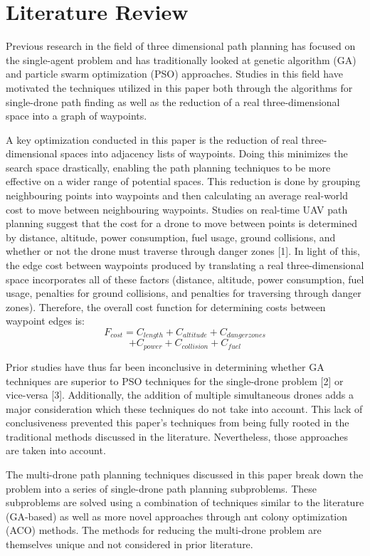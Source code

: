 \documentclass[conference]{IEEEtran}
\begin{document}
\section{Literature Review}
Previous research in the field of three dimensional path planning has focused on the single-agent problem and has traditionally looked at genetic algorithm (GA) and particle swarm optimization (PSO) approaches. Studies in this field have motivated the techniques utilized in this paper both through the algorithms for single-drone path finding as well as the reduction of a real three-dimensional space into a graph of waypoints.

A key optimization conducted in this paper is the reduction of real three-dimensional spaces into adjacency lists of waypoints. Doing this minimizes the search space drastically, enabling the path planning techniques to be more effective on a wider range of potential spaces. This reduction is done by grouping neighbouring points into waypoints and then calculating an average real-world cost to move between neighbouring waypoints. Studies on real-time UAV path planning suggest that the cost for a drone to move between points is determined by distance, altitude, power consumption, fuel usage, ground collisions, and whether or not the drone must traverse through danger zones [1]. In light of this, the edge cost between waypoints produced by translating a real three-dimensional space incorporates
all of these factors (distance, altitude, power consumption, fuel usage, penalties for ground collisions, and penalties for traversing through danger zones). Therefore, the overall cost function for determining costs between waypoint edges is:
$$F_{cost} = C_{length} + C_{altitude} + C_{danger zones}$$
$$ + C_{power} + C_{collision} + C_{fuel}$$

Prior studies have thus far been inconclusive in determining whether GA techniques are superior to PSO techniques for the single-drone problem [2] or vice-versa [3]. Additionally, the addition of multiple simultaneous drones adds a major consideration which these techniques do not take into account. This lack of conclusiveness prevented this paper's techniques from being fully rooted in the traditional methods discussed in the literature. Nevertheless, those approaches are taken into account.

The multi-drone path planning techniques discussed in this paper break down the problem into a series of single-drone path planning subproblems. These subproblems are solved using a combination of techniques similar to the literature (GA-based) as well as more novel approaches through ant colony optimization (ACO) methods. The methods for reducing the multi-drone problem are themselves unique and not considered in prior literature.
\end{document}
